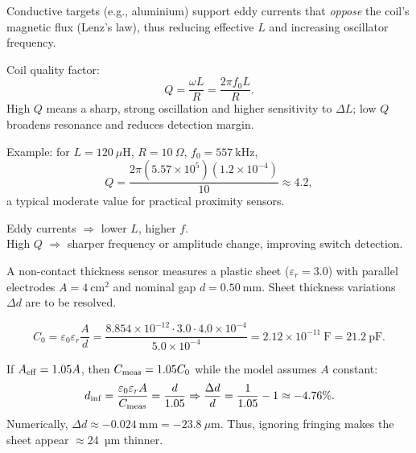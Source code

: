 \begin{solutionblock}
Conductive targets (e.g., aluminium) support eddy currents that \emph{oppose} the coil’s magnetic flux (Lenz’s law), thus reducing effective $L$ and increasing oscillator frequency.

Coil quality factor:
\[
Q = \frac{\omega L}{R} = \frac{2\pi f_0 L}{R}.
\]
High $Q$ means a sharp, strong oscillation and higher sensitivity to $\Delta L$; low $Q$ broadens resonance and reduces detection margin.

Example: for $L=120~\mu\text{H}$, $R=10~\Omega$, $f_0=557~\text{kHz}$,
\[
Q = \frac{2\pi(5.57\times10^5)(1.2\times10^{-4})}{10} \approx 4.2,
\]
a typical moderate value for practical proximity sensors.
 
Eddy currents $\Rightarrow$ lower $L$, higher $f$.\\
High $Q$ $\Rightarrow$ sharper frequency or amplitude change, improving switch detection.
\end{solutionblock}





A non-contact thickness sensor measures a plastic sheet ($\varepsilon_r = 3.0$) with parallel electrodes $A = 4~\text{cm}^2$ and nominal gap $d = 0.50~\text{mm}$.  
Sheet thickness variations $\Delta d$ are to be resolved.



\begin{solutionblock}
\[
C_0 = \varepsilon_0 \varepsilon_r \frac{A}{d}
     = \frac{8.854\times10^{-12} \cdot 3.0 \cdot 4.0\times10^{-4}}{5.0\times10^{-4}}
     = 2.12\times10^{-11}~\text{F} = 21.2~\text{pF.}
\]
\end{solutionblock}




\begin{solutionblock}
If $A_{\rm eff} = 1.05A$, then $C_{\rm meas} = 1.05C_0$ while the model assumes $A$ constant:
\[
d_{\rm inf} = \frac{\varepsilon_0 \varepsilon_r A}{C_{\rm meas}}
             = \frac{d}{1.05} \Rightarrow
\frac{\Delta d}{d} = \frac{1}{1.05} - 1 \approx -4.76\%.
\]
Numerically, $\Delta d \approx -0.024~\text{mm} = -23.8~\mu\text{m}$.  
Thus, ignoring fringing makes the sheet appear $\approx$24~µm thinner.
\end{solutionblock}


